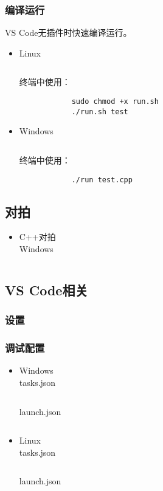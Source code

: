 \documentclass[a4paper, twoside]{article}
\begin{document}
    \subsubsection{编译运行}
    VS Code无插件时快速编译运行。
    \begin{itemize}
        \item Linux
        \inputminted{bash}{../src/附录/环境测试/Linux编译运行脚本.sh}
        终端中使用：
        \begin{verbatim}
            sudo chmod +x run.sh
            ./run.sh test        
        \end{verbatim}
        \item Windows
        \inputminted{batch}{../src/附录/环境测试/Windows编译运行脚本.bat}
        终端中使用：
        \begin{verbatim}
            ./run test.cpp     
        \end{verbatim}
    \end{itemize}
    

\subsection{对拍}
\begin{itemize}
    \item C++对拍\\
    Windows
    \inputminted{cpp}{../src/附录/C++对拍（Windows）.cpp}
\end{itemize}

\subsection{VS Code相关}
    \subsubsection{设置}

    \subsubsection{调试配置}
    \begin{itemize}
        \item Windows\\
        tasks.json
        \inputminted{json}{../src/附录/VSCode/Windows-tasks.json}
        launch.json
        \inputminted{json}{../src/附录/VSCode/Windows-launch.json}
        \item Linux\\
        tasks.json
        \inputminted{json}{../src/附录/VSCode/Linux-tasks.json}
        launch.json
        \inputminted{json}{../src/附录/VSCode/Linux-launch.json}
    \end{itemize}
\end{document}
